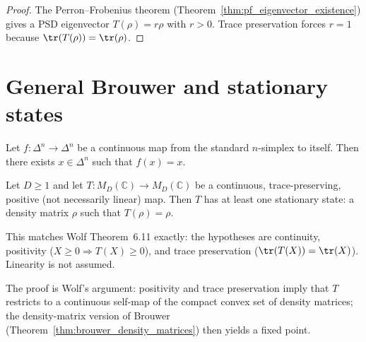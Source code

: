 \begin{proof}\leanok
    The Perron--Frobenius theorem
    (Theorem~\ref{thm:pf_eigenvector_existence}) gives a PSD
    eigenvector $T(\rho)=r\rho$ with $r>0$.  Trace preservation forces
    $r=1$ because $\tr(T(\rho))=\tr(\rho)$.
\end{proof}




\section{General Brouwer and stationary states}

\begin{theorem}
    \label{thm:brouwer_simplex}
    Let $f\colon\Delta^n\to\Delta^n$ be a continuous map from the standard
    $n$-simplex to itself. Then there exists $x\in\Delta^n$ such that
    $f(x)=x$.

\end{theorem}

\begin{theorem}\label{thm:stationary_states}
    \leanok
    Let $D\ge 1$ and let $T\colon M_D(\mathbb C)\to M_D(\mathbb C)$ be a
    continuous, trace-preserving, positive (not necessarily linear) map.
    Then $T$ has at least one stationary state: a density matrix $\rho$
    such that $T(\rho)=\rho$.

    This matches Wolf Theorem~6.11 exactly: the hypotheses are continuity,
    positivity ($X\geq0\Rightarrow T(X)\geq0$), and trace preservation
    ($\tr(T(X))=\tr(X)$).  Linearity is not assumed.

    The proof is Wolf's argument: positivity and trace preservation imply that
    $T$ restricts to a continuous self-map of the compact convex set of
    density matrices; the density-matrix version of Brouwer
    (Theorem~\ref{thm:brouwer_density_matrices}) then yields a fixed point.
\end{theorem}

